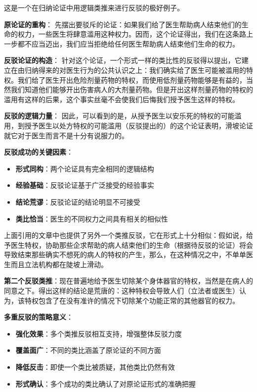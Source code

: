 \begin{examplebox}[title=反驳论证的详细分析]
这是一个在归纳论证中用逻辑类推来进行反驳的极好例子。

\textbf{原论证的重构}：
先摆出要驳斥的论证：如果我们给了医生帮助病人结束他们的生命的权力，一些医生将肆意滥用这种权力。因而，这个论证得出，我们在这条路上一步都不应当迈出，我们应当拒绝给任何医生帮助病人结束他们生命的权力。

\textbf{反驳论证的构造}：
针对这个论证，一个形式一样的类比性的反驳得以提出，它建立在由归纳得来的对医生行为的公共认识之上：我们确实给了医生可能被滥用的特权。我们给了医生开出危险剂量药物的特权，而使用低剂量药物能够是有益的，当然我们知道他们能够开出伤害病人的大剂量药物。但是开出这样剂量药物的特权的滥用有这样的后果，这个事实丝毫不会使我们后悔我们授予医生这样的特权。

\textbf{反驳的逻辑力量}：
因此，可以看到的是，从授予医生以安乐死的特权的可能滥用，到授予医生以处方特权的可能滥用（反驳提出的）的这个论证表明，滑坡论证就它对于医生而言不是十分有说服力的。

\textbf{反驳成功的关键因素}：
\begin{itemize}
\item \textbf{形式同构}：两个论证具有完全相同的逻辑结构
\item \textbf{经验基础}：反驳论证基于广泛接受的经验事实
\item \textbf{结论荒谬}：反驳论证的结论明显不可接受
\item \textbf{类比恰当}：医生的不同权力之间具有相关的相似性
\end{itemize}
\end{examplebox}

\begin{theorembox}[title=第二个类推反驳的分析]
上面引用的文章中也提供了另外一个类推反驳，它在形式上十分相似：假如说，给予医生特权，协助那些企求帮助的病人结束他们的生命（根据待反驳的论证）将会导致结束那些确实不想死的病人的特权的产生，那么，在这种情况之中，不单单医生而且立法机构都在陡坡上滑动。

\textbf{第二个反驳类推}：现在普遍地给予医生切除某个身体器官的特权，当然是在病人的同意之下。得出这样的结论是荒唐的：这种特权会导致人们（立法者或医生）认为，该特权包含了在没有准许的情况下切除某个功能正常的其他器官的权力。

\textbf{多重反驳的策略意义}：
\begin{itemize}
\item \textbf{强化效果}：多个类推反驳相互支持，增强整体反驳力度
\item \textbf{覆盖面广}：不同的类比涵盖了原论证的不同方面
\item \textbf{降低反击}：即使一个类比被质疑，其他类比仍然有效
\item \textbf{形式确认}：多个成功的类比确认了对原论证形式的准确把握
\end{itemize}
\end{theorembox}


